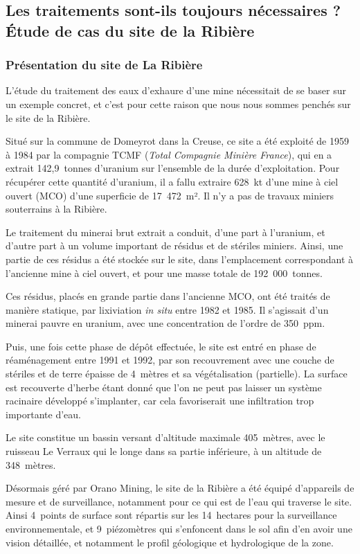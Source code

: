 \documentclass{article}
\begin{document}
\subsection{Les traitements sont-ils toujours nécessaires ? Étude de cas du site de la Ribière}
\subsubsection{Présentation du site de La Ribière}
L’étude du traitement des eaux d’exhaure d’une mine nécessitait de se baser sur un exemple concret, et c’est pour cette raison que nous nous sommes penchés sur le site de la Ribière. 

Situé sur la commune de Domeyrot dans la Creuse, ce site a été exploité de 1959 à 1984 par la compagnie TCMF (\emph{Total Compagnie Minière France}), qui en a extrait 142,9~tonnes d’uranium sur l’ensemble de la durée d’exploitation. Pour récupérer cette quantité d’uranium, il a fallu extraire 628~kt d’une mine à ciel ouvert (MCO) d’une superficie de 17~472~m². Il n’y a pas de travaux miniers souterrains à la Ribière.

Le traitement du minerai brut extrait a conduit, d’une part à l’uranium, et d’autre part à un volume important de résidus et de stériles miniers. Ainsi, une partie de ces résidus a été stockée sur le site, dans l’emplacement correspondant à l'ancienne mine à ciel ouvert, et pour une masse totale de 192~000~tonnes.

Ces résidus, placés en grande partie dans l’ancienne MCO, ont été traités de manière statique, par lixiviation \textit{in situ} entre 1982 et 1985. Il s'agissait d’un minerai pauvre en uranium, avec une concentration de l’ordre de 350~ppm. 

Puis, une fois cette phase de dépôt effectuée, le site est entré en phase de réaménagement entre 1991 et 1992, par son recouvrement avec une couche de stériles et de terre épaisse de 4~mètres et sa végétalisation (partielle). La surface est recouverte d’herbe étant donné que l’on ne peut pas laisser un système racinaire développé s’implanter, car cela favoriserait une infiltration trop importante d’eau.

Le site constitue un bassin versant d’altitude maximale 405~mètres, avec le ruisseau Le Verraux qui le longe dans sa partie inférieure, à un altitude de 348~mètres.

Désormais géré par Orano Mining, le site de la Ribière a été équipé d'appareils de mesure et de surveillance, notamment pour ce qui est de l’eau qui traverse le site. Ainsi 4~points de surface sont répartis sur les 14~hectares pour la surveillance environnementale, et 9~piézomètres qui s’enfoncent dans le sol afin d’en avoir une vision détaillée, et notamment le profil géologique et hydrologique de la zone.
\end{document}
